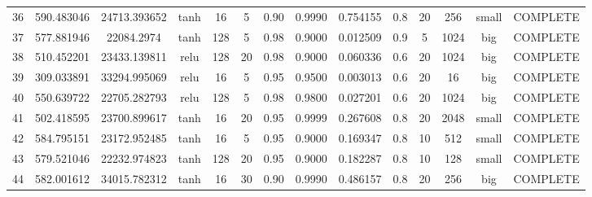 \begin{longtable}{cccccccccccccc}
                       36 &                 590.483046 &                       24713.393652 &            tanh &          16 &              5 &        0.90 & 0.9990 &       0.754155 &             0.8 &                 20 &      256 &     small & COMPLETE \\
                       37 &                 577.881946 &                         22084.2974 &            tanh &         128 &              5 &        0.98 & 0.9000 &       0.012509 &             0.9 &                  5 &     1024 &       big & COMPLETE \\
                       38 &                 510.452201 &                       23433.139811 &            relu &         128 &             20 &        0.98 & 0.9000 &       0.060336 &             0.6 &                 20 &     1024 &       big & COMPLETE \\
                       39 &                 309.033891 &                       33294.995069 &            relu &          16 &              5 &        0.95 & 0.9500 &       0.003013 &             0.6 &                 20 &       16 &       big & COMPLETE \\
                       40 &                 550.639722 &                       22705.282793 &            relu &         128 &              5 &        0.98 & 0.9800 &       0.027201 &             0.6 &                 20 &     1024 &       big & COMPLETE \\
                       41 &                 502.418595 &                       23700.899617 &            tanh &          16 &             20 &        0.95 & 0.9999 &       0.267608 &             0.8 &                 20 &     2048 &     small & COMPLETE \\
                       42 &                 584.795151 &                       23172.952485 &            tanh &          16 &              5 &        0.95 & 0.9000 &       0.169347 &             0.8 &                 10 &      512 &     small & COMPLETE \\
                       43 &                 579.521046 &                       22232.974823 &            tanh &         128 &             20 &        0.95 & 0.9000 &       0.182287 &             0.8 &                 10 &      128 &     small & COMPLETE \\
                       44 &                 582.001612 &                       34015.782312 &            tanh &          16 &             30 &        0.90 & 0.9990 &       0.486157 &             0.8 &                 20 &      256 &       big & COMPLETE \\

\end{longtable}
